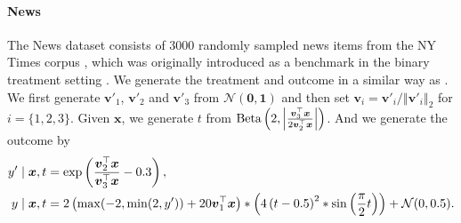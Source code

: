 \paragraph{News}
The News dataset consists of 3000 randomly sampled news items from the NY Times corpus \citep{newman2008bag}, which was originally introduced as a benchmark in the binary treatment setting \citep{johansson2016learning}. We generate the treatment and outcome in a similar way as \citet{bica2020estimating}. We first generate $\boldsymbol{v}'_{1}$, $\boldsymbol{v}'_{2}$ and
$\boldsymbol{v}'_{3}$ from $\mathcal{N}(\boldsymbol{0},\boldsymbol{1})$
and then set $\boldsymbol{v}_{i}=\boldsymbol{v}'_{i}/\left\Vert \boldsymbol{v}'_{i}\right\Vert _{2}$
for $i=\{1,2,3\}$. Given $\boldsymbol{x}$, we generate $t$ from
$\text{Beta}\left(2,\left|\frac{\boldsymbol{v}_{3}^{\top}\boldsymbol{x}}{2\boldsymbol{v}_{2}^{\top}\boldsymbol{x}}\right|\right)$.
And we generate the outcome by 
\begin{align*}
y' & \mid\boldsymbol{x},t=\exp\left(\frac{\boldsymbol{v}_{2}^{\top}\boldsymbol{x}}{\boldsymbol{v}_{3}^{\top}\boldsymbol{x}}-0.3\right),\\
y & \mid\boldsymbol{x},t=2\left(\max(-2,\min(2,y'))+20\boldsymbol{v}_{1}^{\top}\boldsymbol{x}\right)*\left(4\left(t-0.5\right)^{2}*\sin\left(\frac{\pi}{2}t\right)\right)+\mathcal{N}(0,0.5).
\end{align*}